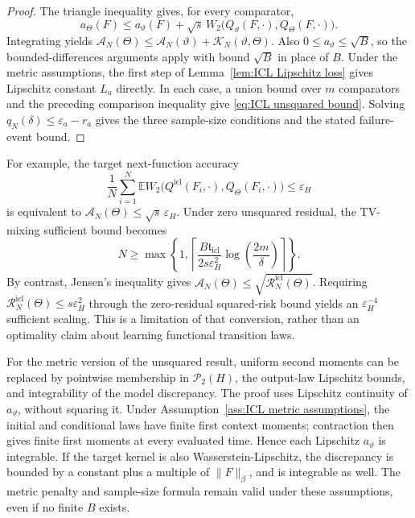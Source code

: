 \begin{proof}
The triangle inequality gives, for every comparator,
\[
a_\Theta(F)\leqslant a_\vartheta(F)
+\sqrt s\,W_2\bigl(Q_\vartheta(F,\cdot),Q_\Theta(F,\cdot)\bigr).
\]
Integrating yields \(\mathcal A_N(\Theta)\leqslant\mathcal A_N(\vartheta)+\mathcal K_N(\vartheta,\Theta)\). Also \(0\leqslant a_\vartheta\leqslant\sqrt B\), so the bounded-differences arguments apply with bound \(\sqrt B\) in place of \(B\). Under the metric assumptions, the first step of Lemma~\ref{lem:ICL Lipschitz loss} gives Lipschitz constant \(L_a\) directly. In each case, a union bound over \(m\) comparators and the preceding comparison inequality give \eqref{eq:ICL unsquared bound}. Solving \(q_N(\delta)\leqslant\varepsilon_a-r_a\) gives the three sample-size conditions and the stated failure-event bound.
\end{proof}

For example, the target next-function accuracy
\[
\frac1N\sum_{i=1}^N\mathbb E
W_2\bigl(Q^{\mathrm{icl}}(F_i,\cdot),Q_\Theta(F_i,\cdot)\bigr)
\leqslant\varepsilon_H
\]
is equivalent to \(\mathcal A_N(\Theta)\leqslant\sqrt s\,\varepsilon_H\). Under zero unsquared residual, the TV-mixing sufficient bound becomes
\[
N\geqslant\max\left\{1,\left\lceil
\frac{B\mathfrak t_{\mathrm{icl}}}{2s\varepsilon_H^2}
\log\left(\frac{2m}{\delta}\right)\right\rceil\right\}.
\]
By contrast, Jensen's inequality gives \(\mathcal A_N(\Theta)\leqslant\sqrt{\mathcal R_N^{\mathrm{icl}}(\Theta)}\). Requiring \(\mathcal R_N^{\mathrm{icl}}(\Theta)\leqslant s\varepsilon_H^2\) through the zero-residual squared-risk bound yields an \(\varepsilon_H^{-4}\) sufficient scaling. This is a limitation of that conversion, rather than an optimality claim about learning functional transition laws.

\begin{remark}
\label{rem:ICL unsquared unbounded}
For the metric version of the unsquared result, uniform second moments can be replaced by pointwise membership in \(\mathcal P_2(H)\), the output-law Lipschitz bounds, and integrability of the model discrepancy. The proof uses Lipschitz continuity of \(a_\vartheta\), without squaring it. Under Assumption~\ref{ass:ICL metric assumptions}, the initial and conditional laws have finite first context moments; contraction then gives finite first moments at every evaluated time. Hence each Lipschitz \(a_\vartheta\) is integrable. If the target kernel is also Wasserstein-Lipschitz, the discrepancy is bounded by a constant plus a multiple of \(\|F\|_\beta\), and is integrable as well. The metric penalty and sample-size formula remain valid under these assumptions, even if no finite \(B\) exists.
\end{remark}

